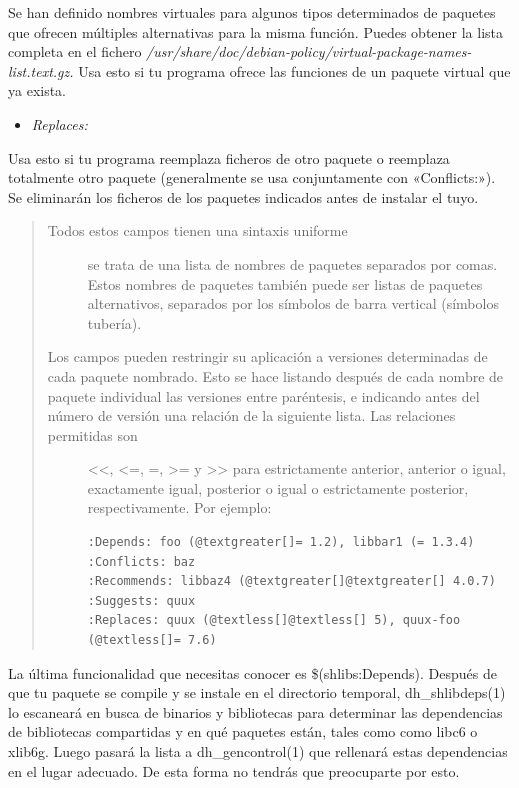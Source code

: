 \documentclass[letterpaper,12pt,spanish]{manual}
\begin{document}
Se han definido nombres virtuales para algunos tipos determinados de paquetes que ofrecen múltiples alternativas para la misma función. Puedes obtener la lista completa en el fichero \emph{/usr/share/doc/debian-policy/virtual-package-names-list.text.gz.} Usa esto si tu programa ofrece las funciones de un paquete virtual que ya exista.
\begin{itemize}
\item {} 
\emph{Replaces:}

\end{itemize}

Usa esto si tu programa reemplaza ficheros de otro paquete o reemplaza totalmente otro paquete (generalmente se usa conjuntamente con «Conflicts:»). Se eliminarán los ficheros de los paquetes indicados antes de instalar el tuyo.
\begin{quote}\begin{description}
\item[{Todos estos campos tienen una sintaxis uniforme}] \leavevmode
se trata de una lista de nombres de paquetes separados por comas. Estos nombres de paquetes también puede ser listas de paquetes alternativos, separados por los símbolos de barra vertical \textbar{} (símbolos tubería).

\item[{Los campos pueden restringir su aplicación a versiones determinadas de cada paquete nombrado. Esto se hace listando después de cada nombre de paquete individual las versiones entre paréntesis, e indicando antes del número de versión una relación de la siguiente lista. Las relaciones permitidas son}] \leavevmode
\textless{}\textless{}, \textless{}=, =, \textgreater{}= y \textgreater{}\textgreater{} para estrictamente anterior, anterior o igual, exactamente igual, posterior o igual o estrictamente posterior, respectivamente. Por ejemplo:

\begin{Verbatim}[commandchars=@\[\]]
:Depends: foo (@textgreater[]= 1.2), libbar1 (= 1.3.4)
:Conflicts: baz
:Recommends: libbaz4 (@textgreater[]@textgreater[] 4.0.7)
:Suggests: quux
:Replaces: quux (@textless[]@textless[] 5), quux-foo (@textless[]= 7.6)
\end{Verbatim}

\end{description}\end{quote}

La última funcionalidad que necesitas conocer es \$(shlibs:Depends). Después de que tu paquete se compile y se instale en el directorio temporal, dh\_shlibdeps(1) lo escaneará en busca de binarios y bibliotecas para determinar las dependencias de bibliotecas compartidas y en qué paquetes están, tales como como libc6 o xlib6g. Luego pasará la lista a dh\_gencontrol(1) que rellenará estas dependencias en el lugar adecuado. De esta forma no tendrás que preocuparte por esto.
\end{document}
